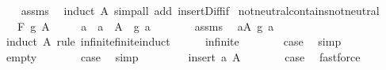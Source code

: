 \begin{isabellebody}
%
\isadelimproof
\ \ %
\endisadelimproof
%
\isatagproof
{}\isamarkupfalse%
\ assms\ \isamarkupfalse%
\ {\isacharparenleft}{\kern0pt}induct\ A{\isacharparenright}{\kern0pt}\ {\isacharparenleft}{\kern0pt}simp{\isacharunderscore}{\kern0pt}all\ add{\isacharcolon}{\kern0pt}\ insert{\isacharunderscore}{\kern0pt}Diff{\isacharunderscore}{\kern0pt}if{\isacharparenright}{\kern0pt}%
\endisatagproof
{\isafoldproof}%
%
\isadelimproof
\isanewline
%
\endisadelimproof
\isanewline
{}\isamarkupfalse%
\ not{\isacharunderscore}{\kern0pt}neutral{\isacharunderscore}{\kern0pt}contains{\isacharunderscore}{\kern0pt}not{\isacharunderscore}{\kern0pt}neutral{\isacharcolon}{\kern0pt}\isanewline
\ \ \ {\isachardoublequoteopen}F\ g\ A\ {\isasymnoteq}\ \isanewline
\ \ \ a\ \ {\isachardoublequoteopen}a\ {\isasymin}\ A{\isachardoublequoteclose}\ \ {\isachardoublequoteopen}g\ a\ {\isasymnoteq}\ \isanewline
%
\isadelimproof
%
\endisadelimproof
%
\isatagproof
{}\isamarkupfalse%
\ {\isacharminus}{\kern0pt}\isanewline
\ \ \isamarkupfalse%
\ assms\ \isamarkupfalse%
\ {\isachardoublequoteopen}{\isasymexists}a{\isasymin}A{\isachardot}{\kern0pt}\ g\ a\ {\isasymnoteq}\ \isanewline
\ \ \isamarkupfalse%
\ {\isacharparenleft}{\kern0pt}induct\ A\ rule{\isacharcolon}{\kern0pt}\ infinite{\isacharunderscore}{\kern0pt}finite{\isacharunderscore}{\kern0pt}induct{\isacharparenright}{\kern0pt}\isanewline
\ \ \ \ \isamarkupfalse%
\ infinite\isanewline
\ \ \ \ \isamarkupfalse%
\ \isamarkupfalse%
\ {\isacharquery}{\kern0pt}case\ \isamarkupfalse%
\ simp\isanewline
\ \ \isamarkupfalse%
\isanewline
\ \ \ \ \isamarkupfalse%
\ empty\isanewline
\ \ \ \ \isamarkupfalse%
\ \isamarkupfalse%
\ {\isacharquery}{\kern0pt}case\ \isamarkupfalse%
\ simp\isanewline
\ \ \isamarkupfalse%
\isanewline
\ \ \ \ \isamarkupfalse%
\ {\isacharparenleft}{\kern0pt}insert\ a\ A{\isacharparenright}{\kern0pt}\isanewline
\ \ \ \ \isamarkupfalse%
\ \isamarkupfalse%
\ {\isacharquery}{\kern0pt}case\ \isamarkupfalse%
\ fastforce\isanewline
\ \ \isamarkupfalse%
\isanewline

\end{isabellebody}

